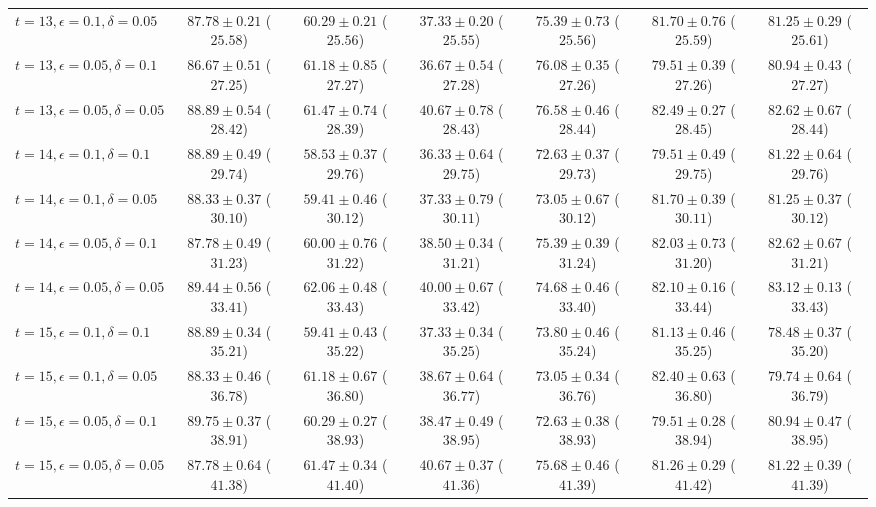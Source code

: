 \documentclass[journal]{IEEEtran}
\theoremstyle{definition}
\begin{document}
\begin{table*}[!t]
\begin{center}
{\begin{tabular}{|l|c|c|c|c|c|c|}
$t=13, \epsilon = 0.1, \delta = 0.05$  & $87.78 \pm 0.21$ ($25.58$) & $60.29 \pm 0.21$ ($25.56$) & $37.33 \pm 0.20$ ($25.55$) & $75.39 \pm 0.73$ ($25.56$) & $81.70 \pm 0.76$ ($25.59$) & $81.25 \pm 0.29$ ($25.61$) \\
$t=13, \epsilon = 0.05, \delta = 0.1$  & $86.67 \pm 0.51$ ($27.25$) & $61.18 \pm 0.85$ ($27.27$) & $36.67 \pm 0.54$ ($27.28$) & $76.08 \pm 0.35$ ($27.26$) & $79.51 \pm 0.39$ ($27.26$) & $80.94 \pm 0.43$ ($27.27$) \\
$t=13, \epsilon = 0.05, \delta = 0.05$ & $88.89 \pm 0.54$ ($28.42$) & $61.47 \pm 0.74$ ($28.39$) & $40.67 \pm 0.78$ ($28.43$) & $76.58 \pm 0.46$ ($28.44$) & $82.49 \pm 0.27$ ($28.45$) & $82.62 \pm 0.67$ ($28.44$) \\
\hline
$t=14, \epsilon = 0.1, \delta = 0.1$   & $88.89 \pm 0.49$ ($29.74$) & $58.53 \pm 0.37$ ($29.76$) & $36.33 \pm 0.64$ ($29.75$) & $72.63 \pm 0.37$ ($29.73$) & $79.51 \pm 0.49$ ($29.75$) & $81.22 \pm 0.64$ ($29.76$) \\
$t=14, \epsilon = 0.1, \delta = 0.05$  & $88.33 \pm 0.37$ ($30.10$) & $59.41 \pm 0.46$ ($30.12$) & $37.33 \pm 0.79$ ($30.11$) & $73.05 \pm 0.67$ ($30.12$) & $81.70 \pm 0.39$ ($30.11$) & $81.25 \pm 0.37$ ($30.12$) \\
$t=14, \epsilon = 0.05, \delta = 0.1$  & $87.78 \pm 0.49$ ($31.23$) & $60.00 \pm 0.76$ ($31.22$) & $38.50 \pm 0.34$ ($31.21$) & $75.39 \pm 0.39$ ($31.24$) & $82.03 \pm 0.73$ ($31.20$) & $82.62 \pm 0.67$ ($31.21$) \\
$t=14, \epsilon = 0.05, \delta = 0.05$ & $89.44 \pm 0.56$ ($33.41$) & $62.06 \pm 0.48$ ($33.43$) & $40.00 \pm 0.67$ ($33.42$) & $74.68 \pm 0.46$ ($33.40$) & $82.10 \pm 0.16$ ($33.44$) & $83.12 \pm 0.13$ ($33.43$) \\
\hline
$t=15, \epsilon = 0.1, \delta = 0.1$   & $88.89 \pm 0.34$ ($35.21$) & $59.41 \pm 0.43$ ($35.22$) & $37.33 \pm 0.34$ ($35.25$) & $73.80 \pm 0.46$ ($35.24$) & $81.13 \pm 0.46$ ($35.25$) & $78.48 \pm 0.37$ ($35.20$) \\
$t=15, \epsilon = 0.1, \delta = 0.05$  & $88.33 \pm 0.46$ ($36.78$) & $61.18 \pm 0.67$ ($36.80$) & $38.67 \pm 0.64$ ($36.77$) & $73.05 \pm 0.34$ ($36.76$) & $82.40 \pm 0.63$ ($36.80$) & $79.74 \pm 0.64$ ($36.79$) \\
$t=15, \epsilon = 0.05, \delta = 0.1$  & $89.75 \pm 0.37$ ($38.91$) & $60.29 \pm 0.27$ ($38.93$) & $38.47 \pm 0.49$ ($38.95$) & $72.63 \pm 0.38$ ($38.93$) & $79.51 \pm 0.28$ ($38.94$) & $80.94 \pm 0.47$ ($38.95$) \\
$t=15, \epsilon = 0.05, \delta = 0.05$ & $87.78 \pm 0.64$ ($41.38$) & $61.47 \pm 0.34$ ($41.40$) & $40.67 \pm 0.37$ ($41.36$) & $75.68 \pm 0.46$ ($41.39$) & $81.26 \pm 0.29$ ($41.42$) & $81.22 \pm 0.39$ ($41.39$) \\
\hline
\end{tabular}}
\end{center}
\end{table*}
\end{document}
